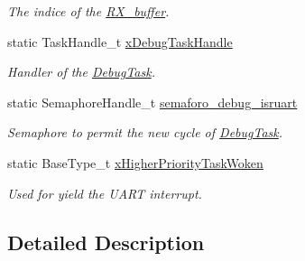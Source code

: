 \begin{DoxyCompactItemize}
\begin{DoxyCompactList}\small\item\em The indice of the \hyperlink{group___debug___private___variables_ga17916f59674854b82e55fe3d39a36d81}{R\+X\+\_\+buffer}. \end{DoxyCompactList}\item 
static Task\+Handle\+\_\+t \hyperlink{group___debug___private___variables_gab492c12c83b7838e793b80c291ed58aa}{x\+Debug\+Task\+Handle}\hypertarget{group___debug___private___variables_gab492c12c83b7838e793b80c291ed58aa}{}\label{group___debug___private___variables_gab492c12c83b7838e793b80c291ed58aa}

\begin{DoxyCompactList}\small\item\em Handler of the \hyperlink{group___debug___exported___functions___group2_ga0e7fca846e34e06a1f62249fe8a30a44}{Debug\+Task}. \end{DoxyCompactList}\item 
static Semaphore\+Handle\+\_\+t \hyperlink{group___debug___private___variables_ga4c5de14a4644bf21d004fd0d61f1fa98}{semaforo\+\_\+debug\+\_\+isruart}\hypertarget{group___debug___private___variables_ga4c5de14a4644bf21d004fd0d61f1fa98}{}\label{group___debug___private___variables_ga4c5de14a4644bf21d004fd0d61f1fa98}

\begin{DoxyCompactList}\small\item\em Semaphore to permit the new cycle of \hyperlink{group___debug___exported___functions___group2_ga0e7fca846e34e06a1f62249fe8a30a44}{Debug\+Task}. \end{DoxyCompactList}\item 
static Base\+Type\+\_\+t \hyperlink{group___debug___private___variables_ga9d9a749ad99ec3d4a6886d5277b9ba87}{x\+Higher\+Priority\+Task\+Woken}\hypertarget{group___debug___private___variables_ga9d9a749ad99ec3d4a6886d5277b9ba87}{}\label{group___debug___private___variables_ga9d9a749ad99ec3d4a6886d5277b9ba87}

\begin{DoxyCompactList}\small\item\em Used for yield the U\+A\+RT interrupt. \end{DoxyCompactList}\end{DoxyCompactItemize}


\subsection{Detailed Description}
